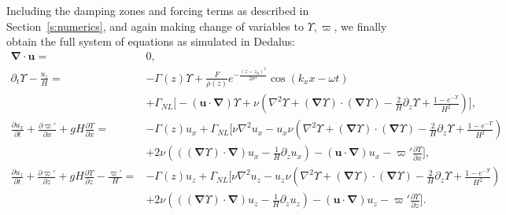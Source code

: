 \documentclass[
        fleqn,
        usenatbib,
        referee,
    ]{mnras}
\newcommand*{\pd}[2]{\frac{\partial#1}{\partial#2}}
\newcommand*{\p}[1]{\left(#1\right)}
\newcommand*{\bm}[1]{\mathbf{#1}}
\begin{document}
Including the damping zones and forcing terms as described in
Section~\ref{s:numerics}, and again making change of variables to $\Upsilon,
\varpi$, we finally obtain the full system of equations as simulated in Dedalus:
\begin{subequations}\label{se:dedalus_eqs}
    \begin{align}
        \bm{\nabla} \cdot \bm{u} ={}& 0,\\
        \partial_t \Upsilon - \frac{u_z}{H}
            ={}& -\Gamma(z) \Upsilon
                + \frac{F}{\overline{\rho}(z)}e^{-\frac{(z - z_0)^2}{2\sigma^2}}
                    \cos \p{k_xx - \omega t}\nonumber\\
            & + \Gamma_{NL} \bigg[-\p{\bm{u} \cdot \bm{\nabla}}\Upsilon
                + \nu\p{\nabla^2 \Upsilon + \p{
                    \bm{\nabla} \Upsilon} \cdot \p{\bm{\nabla}\Upsilon}
                    - \frac{2}{H}\partial_z \Upsilon
                    + \frac{1 - e^{-\Upsilon}}{H^2}}\bigg],\\
        \pd{u_x}{t} + \pd{\varpi'}{x} + gH\pd{\Upsilon}{x} ={}&
            -\Gamma(z) u_x
            + \Gamma_{NL}\bigg[\nu \nabla^2 u_x
            - u_x \nu\p{\nabla^2 \Upsilon + \p{\bm{\nabla} \Upsilon} \cdot
                \p{\bm{\nabla}\Upsilon} - \frac{2}{H}\partial_z \Upsilon
                + \frac{1 - e^{-\Upsilon}}{H^2}}\nonumber\\
            &+ 2\nu \p{\p{\p{\bm{\nabla}\Upsilon} \cdot \bm{\nabla}}u_x
                - \frac{1}{H}\partial_z u_x}
                - \p{\bm{u} \cdot \bm{\nabla}}u_x
                - \varpi' \pd{\Upsilon}{x}\bigg],\\
        \pd{u_z}{t} + \pd{\varpi'}{z} + gH\pd{\Upsilon}{z} - \frac{\varpi'}{H}
            ={}& -\Gamma(z) u_z
            +\Gamma_{NL}\bigg[\nu \nabla^2 u_z
            - u_z \nu\p{\nabla^2 \Upsilon + \p{\bm{\nabla} \Upsilon} \cdot
                \p{\bm{\nabla}\Upsilon} - \frac{2}{H}\partial_z \Upsilon
                + \frac{1 - e^{-\Upsilon}}{H^2}}\nonumber\\
            &+ 2\nu \p{\p{\p{\bm{\nabla}\Upsilon} \cdot \bm{\nabla}}u_z -
                \frac{1}{H}\partial_z u_{z}}
            - \p{\bm{u} \cdot \bm{\nabla}}u_z
            - \varpi' \pd{\Upsilon}{z}\bigg].
    \end{align}
\end{subequations}
\label{lastpage} %
\end{document}
